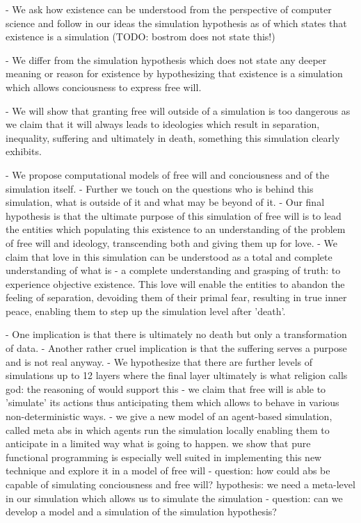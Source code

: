 - We ask how existence can be understood from the perspective of computer science and follow in our ideas the simulation hypothesis as of \cite{bostrom_are_2003} which states that existence is a simulation (TODO: bostrom does not state this!)

- We differ from the simulation hypothesis which does not state any deeper meaning or reason for existence by hypothesizing that existence is a simulation which allows conciousness to express free will.

- We will show that granting free will outside of a simulation is too dangerous as we claim that it will always leads to ideologies which result in separation, inequality, suffering and ultimately in death, something this simulation clearly exhibits.

- We propose computational models of free will and conciousness and of the simulation itself.
- Further we touch on the questions who is behind this simulation, what is outside of it and what may be beyond of it.
- Our final hypothesis is that the ultimate purpose of this simulation of free will is to lead the entities which populating this existence to an understanding of the problem of free will and ideology, transcending both and giving them up for love.
- We claim that love in this simulation can be understood as a total and complete understanding of what is - a complete understanding and grasping of truth: to experience objective existence. This love will enable the entities to abandon the feeling of separation, devoiding them of their primal fear, resulting in true inner peace, enabling them to step up the simulation level after 'death'.

- One implication is that there is ultimately no death but only a transformation of data.
- Another rather cruel implication is that the suffering serves a purpose and is not real anyway.
- We hypothesize that there are further levels of simulations up to 12 layers where the final layer ultimately is what religion calls god: the reasoning of \cite{steinhart_theological_2010} would support this
- we claim that free will is able to 'simulate' its actions thus anticipating them which allows to behave in various non-deterministic ways.
- we give a new model of an agent-based simulation, called meta abs in which agents run the simulation locally enabling them to anticipate in a limited way what is going to happen. we show that pure functional programming is especially well suited in implementing this new technique and explore it in a model of free will
- question: how could abs be capable of simulating conciousness and free will? hypothesis: we need a meta-level in our simulation which allows us to simulate the simulation
- question: can we develop a model and a simulation of the simulation hypothesis?\\